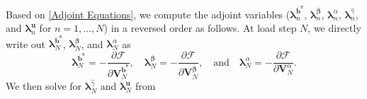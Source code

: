 \documentclass[preprint,11pt]{elsarticle}
\theoremstyle{definition}
\begin{document}
Based on \eqref{Adjoint Equations}, we compute the adjoint variables ($\boldsymbol{\lambda}_n^{\overline{\mathbf{b}}^\texttt{e}}$, $\boldsymbol{\lambda}_n^{\overline{\boldsymbol{\beta}}}$, $\boldsymbol{\lambda}_n^\alpha$, $\boldsymbol{\lambda}_n^{\widehat{\gamma}}$, and $\boldsymbol{\lambda}_n^\mathbf{u}$ for $n = 1,\ldots,N$) in a reversed order as follows. At load step $N$, we directly write out $\boldsymbol{\lambda}_N^{\overline{\mathbf{b}}^\texttt{e}}$, $\boldsymbol{\lambda}_N^{\overline{\boldsymbol{\beta}}}$, and $\boldsymbol{\lambda}_N^\alpha$ as
\begin{equation*}
    \boldsymbol{\lambda}_N^{\overline{\mathbf{b}}^\texttt{e}} = - \dfrac{\partial \mathcal{F}}{\partial \mathbf{V}_N^{\overline{\mathbf{b}}^\texttt{e}}}, \quad
    \boldsymbol{\lambda}_N^{\overline{\boldsymbol{\beta}}} = - \dfrac{\partial \mathcal{F}}{\partial \mathbf{V}_N^{\overline{\boldsymbol{\beta}}}}, \quad \text{and} \quad
    \boldsymbol{\lambda}_N^\alpha = - \dfrac{\partial \mathcal{F}}{\partial \mathbf{V}_N^\alpha}.
\end{equation*}
We then solve for $\boldsymbol{\lambda}_N^{\widehat{\gamma}}$ and $\boldsymbol{\lambda}_N^\mathbf{u}$ from 
\end{document}
